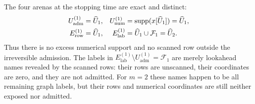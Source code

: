 The four arenas at the stopping time are exact and distinct:
\begin{equation}
 \begin{aligned}
 U_{\mathrm{adm}}^{(1)}&=\widehat U_1,
 &U_{\mathrm{num}}^{(1)}&=\operatorname{supp}(x[\widehat U_1])=\widehat U_1,\\
 E_{\mathrm{row}}^{(1)}&=\widehat U_1,
 &E_{\mathrm{lab}}^{(1)}&=\widehat U_1\cup\mathcal F_1=\widehat U_2.
 \end{aligned}
 \label{eq:branch-caterpillar-first-layer-arenas}
\end{equation}
Thus there is no excess numerical support and no scanned row outside the
irreversible admission.  The labels in
$E_{\mathrm{lab}}^{(1)}\setminus U_{\mathrm{adm}}^{(1)}=\mathcal F_1$ are merely
lookahead names revealed by the scanned rows: their rows are unscanned, their
coordinates are zero, and they are not admitted.  For $m=2$ these names happen
to be all remaining graph labels, but their rows and numerical coordinates
are still neither exposed nor admitted.

